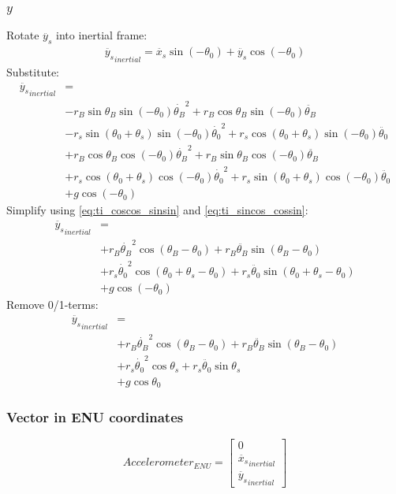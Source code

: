 \documentclass[titlepage]{article}
\numberwithin{equation}{section}
\begin{document}
\subsubsection{$y$}
Rotate $\ddot{y_s}$ into inertial frame:
\begin{align}
\ddot{y_s}_{inertial} = \ddot{x_s} \sin{(-\theta_0)} + \ddot{y_s} \cos{(-\theta_0)} 
\end{align}
Substitute:
\begin{align}
\ddot{y_s}_{inertial} &= \nonumber \\
    &- r_B \sin \theta_B \sin{(-\theta_0)} \dot{\theta_B}^2
     + r_B \cos \theta_B \sin{(-\theta_0)} \ddot{\theta_B} \nonumber \\
    &- r_s \sin{(\theta_0 + \theta_s)} \sin{(-\theta_0)} \dot{\theta_0}^2
     + r_s \cos{(\theta_0 + \theta_s)} \sin{(-\theta_0)} \ddot{\theta_0} \nonumber \\
    &+ r_B \cos \theta_B \cos{(-\theta_0)} \dot{\theta_B}^2
     + r_B \sin \theta_B \cos{(-\theta_0)} \ddot{\theta_B} \nonumber \\
    &+ r_s \cos{(\theta_0 + \theta_s)} \cos{(-\theta_0)} \dot{\theta_0}^2
     + r_s \sin{(\theta_0 + \theta_s)} \cos{(-\theta_0)} \ddot{\theta_0} \nonumber \\
    &+ g \cos{(-\theta_0)}
\end{align}
Simplify using \ref{eq:ti_coscos_sinsin} and \ref{eq:ti_sincos_cossin}:
\begin{align}
\ddot{y_s}_{inertial} &= \nonumber \\
    &+ r_B \dot{\theta_B}^2 \cos{(\theta_B - \theta_0)}
     + r_B \ddot{\theta_B} \sin{(\theta_B - \theta_0)} \nonumber \\
    &+ r_s \dot{\theta_0}^2 \cos{(\theta_0 + \theta_s - \theta_0)}
     + r_s \ddot{\theta_0} \sin{(\theta_0 + \theta_s - \theta_0)} \nonumber \\
    &+ g \cos{(-\theta_0)}
\end{align}
Remove 0/1-terms:
\begin{align}
\ddot{y_s}_{inertial} &= \nonumber \\
    &+ r_B \dot{\theta_B}^2 \cos{(\theta_B - \theta_0)}
     + r_B \ddot{\theta_B} \sin{(\theta_B - \theta_0)} \nonumber \\
    &+ r_s \dot{\theta_0}^2 \cos{\theta_s}
     + r_s \ddot{\theta_0} \sin{\theta_s} \nonumber \\
    &+ g \cos\theta_0
\end{align}

\subsubsection{Vector in ENU coordinates}
\begin{equation}
Accelerometer_{ENU} = \left[ \begin{array}{c}
0 \\
\ddot{x_s}_{inertial} \\
\ddot{y_s}_{inertial}
\end{array} \right] \label{eq:accel_vec}
\end{equation}
\end{document}
